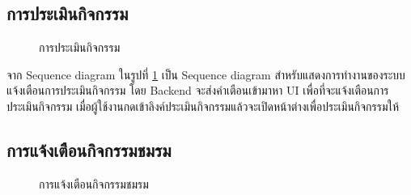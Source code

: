 \documentclass[14pt,oneside,openright,a4paper]{cpe-thai-project}
\begin{document}
\subsection{การประเมินกิจกรรม}

  \begin{figure}[!h]\centering
    \setlength{\fboxrule}{0.5mm} %
    \setlength{\fboxsep}{0.5cm}
    \caption{การประเมินกิจกรรม}\label{fig:Event evaluation}
  \end{figure}

  จาก Sequence diagram ในรูปที่ \ref{fig:Event evaluation} เป็น Sequence diagram สำหรับแสดงการทำงานของระบบแจ้งเตือนการประเมินกิจกรรม โดย Backend จะส่งคำเตือนเข้ามาหา UI เพื่อที่จะแจ้งเตือนการประเมินกิจกรรม เมื่อผู้ใช้งานกดเข้าลิงค์ประเมินกิจกรรมแล้วจะเปิดหน้าต่างเพื่อประเมินกิจกรรมให้

\newpage

\subsection{การแจ้งเตือนกิจกรรมชมรม}

  \begin{figure}[!h]\centering
    \setlength{\fboxrule}{0.5mm} %
    \setlength{\fboxsep}{0.5cm}
    \caption{การแจ้งเตือนกิจกรรมชมรม}\label{fig:Notification about event from club}
  \end{figure}
\end{document}
